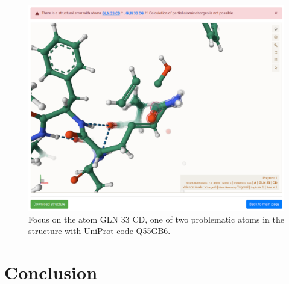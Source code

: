 \documentclass[
  digital,     %
  oneside,     %
  nosansbold,  %
  nocolorbold, %
  lof,         %
  lot,         %
]{fithesis4}
\begin{document}
\begin{figure}[htbp]
  \begin{center}
    \includegraphics[width=\textwidth]{figures/wrong_structure_focus.png}
  \end{center}
  \caption{Focus on the atom GLN 33 CD, one of two problematic atoms in the structure with UniProt code Q55GB6.}
  \label{fig:wrong_structure_focus}
\end{figure}

\chapter*{Conclusion}

\printbibliography[heading=bibintoc]
\end{document}
